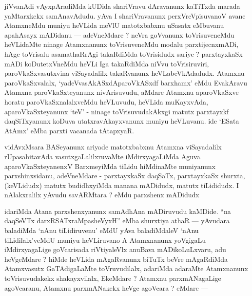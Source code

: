 \begin{artha}
jiVvanAdi vAyxpAradiMda kUDida shariVravu dAravanunx kaTiTxda marada yaMtarxkekx samAnavAdudu. yAva I shariVravanunx perxVreVpisuvanoV avane AtamxneMdu muniyu heVLida meVlU matotxbabxnu uSasatx eMbuvanu apahAsayx mADidanu --- adeVneMdare ? neVra goVvanunx toVrisuveneMdu heVLidaMte ninage Atamxnanunx toVrisuveneMdu modalu parxtijecnxmADi, hAge toVrisalu asamathaRrAgi takaRdiMda toVrisidudx sariye ? parxtayxkaSx mADi koDutetxVneMdu heVLi Iga takaRdiMda niVvu toVrisiruviri, paroVkaSxvasutxvina viSayadalilx takaRvanunx heVLabeVkAdadudx. Atamxnu paroVkaSxvalalx, `yadeVvasAkASxdAparoVkASxdf barxhamx' eMdu EvakAravu Atamxna paroVkaSxteyanunx nivArisuvudu, aMdare Atamxnu aparoVkaSxve horatu paroVkaSxnalalxveMdu heVLuvudu, heVLida muKayxvAda, aparoVkaSxteyanunx `teV' - ninage toVrisuvudakAkxgi matutx parxtayxkf daqSiTxyanunx koDuva utatxravAkayxvanunx muniyu heVLuvanu. ide `ESata AtAmx' eMba parxti vacanada tAtapxyaR.
\end{artha}


\begin{artha}
vidAvxMsara BASeyanunx ariyade matotxbabxnu Atamxna viSayadalilx rUpasahita\-vAda vasutxgaLalilxruvaMte iMdirxyagaLiMda Aguva aparoVkaSxteyanenxV BarxmeyiMda tiLidu hiMdinaMte muniyanunx parxshinxsidanu, adeVneMdare - parxtayxkaSx daqSaTx, parxtayxkaSx shurxta, (keVLidudx) matutx budidhxyiMda manana mADidudx, matutx tiLididudx. I nAlakxralilx yAvudu savARMtara ? eMdu parxshenx mADidudx 
\end{artha}


\begin{artha}
idariMda Atana parxshenxyanunx samAdhAna mADiruvudu kaMDide. ``na daqSeVTx darxRSATxraMpasheVyxH'' eMba shurxtiya athaR --- yAvudara baladiMda `nAnu tiLidiruvenu' eMdU yAva baladiMdaleV `nAnu tiLidilalx'veMdU muniyu heVLiruvano A Atamxnanunx yoVgigaLu iMdirxyagaLige goVcarisada riVtiyaleVlx anuBava mADikoLuLxvaru, adu heVgeMdare ? hiMde heVLida mAgaRvanunx biTuTx beVre mAgaRdiMda Atamxvasutx GaTAdigaLaMte toVruvudilalx, adariMda adaraMte Atamxnanunx toVrisuvudakekx shakayxvilalx, EkeMdare ? Atamxnu parxmANagaLige agoVcaranu, Atamxnu parxmANakekx heVge agoVcara ? eMdare --- 
\end{artha}



